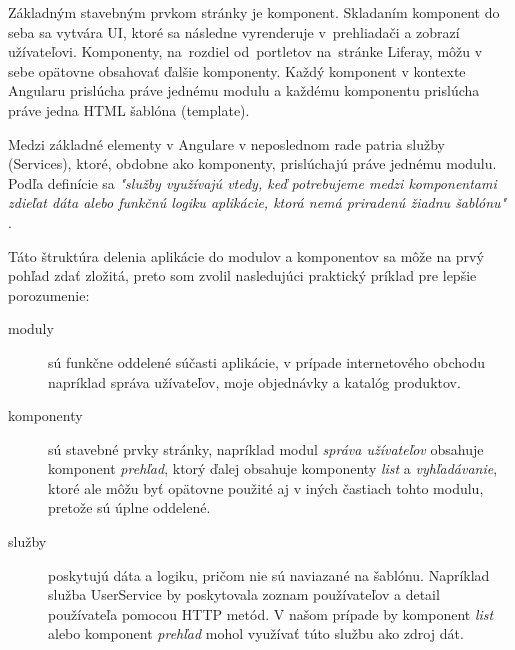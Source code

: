 \documentclass[
  printed, %
  twoside, %
  notable,   %
  nolof,   %
  nolot,   %
]{fithesis3}
\begin{document}
Základným stavebným prvkom stránky je komponent. Skladaním komponent do seba sa vytvára UI, ktoré sa následne vyrenderuje v~prehliadači a zobrazí užívateľovi. Komponenty, na~rozdiel od~portletov na~stránke Liferay, môžu v sebe opätovne obsahovať ďalšie komponenty. Každý komponent v kontexte Angularu prislúcha práve jednému modulu a každému komponentu prislúcha práve jedna HTML šablóna (template).

Medzi základné elementy v Angulare v neposlednom rade patria služby (Services), ktoré, obdobne ako komponenty, prislúchajú práve jednému modulu. Podľa definície sa \textit{"služby využívajú vtedy, keď potrebujeme medzi komponentami zdieľat dáta alebo funkčnú logiku aplikácie, ktorá nemá priradenú žiadnu šablónu"} \cite{angular}.

Táto štruktúra delenia aplikácie do modulov a komponentov sa môže na prvý pohľad zdať zložitá, preto som zvolil nasledujúci praktický príklad pre lepšie porozumenie:
\begin{description}
\item[moduly] sú funkčne oddelené súčasti aplikácie, v prípade internetového obchodu napríklad správa užívateľov, moje objednávky a katalóg produktov.
\item[komponenty] sú stavebné prvky stránky, napríklad modul \textit{správa užívateľov} obsahuje komponent \textit{prehľad}, ktorý ďalej obsahuje komponenty \textit{list} a \textit{vyhľadávanie}, ktoré ale môžu byť opätovne použité aj v iných častiach tohto modulu, pretože sú úplne oddelené.
\item[služby] poskytujú dáta a logiku, pričom nie sú naviazané na šablónu. Napríklad služba UserService by poskytovala zoznam používateľov a detail používateľa pomocou HTTP metód. V našom prípade by komponent \textit{list} alebo komponent \textit{prehľad} mohol využívať túto službu ako zdroj dát.
\end{description}
\end{document}
